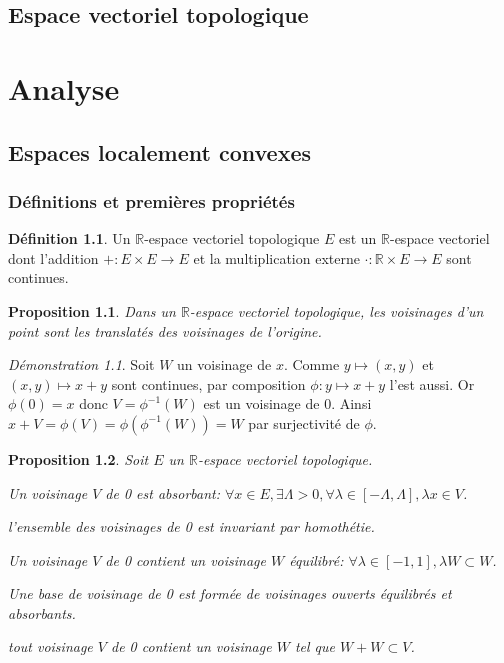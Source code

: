 \documentclass[a4paper, 11pt, french]{book}
\newenvironment{itemise}{\itemize}{\enditemize}
\theoremstyle{plain} %
\newtheorem{proposition}{Proposition}
\theoremstyle{definition} %
\newtheorem{definition}{Définition}
\theoremstyle{remark} %
\newtheorem*{demonstration}{Démonstration}
\newcommand{\1}{\mathds{1}}
\newcommand{\inv}[1]{#1^{-1}}
\newcommand{\R}{\mathbb{R}}
\begin{document}
\chapter{Espace vectoriel topologique}

\part{Analyse}

\chapter{Espaces localement convexes}

\section{Définitions et premières propriétés}

\begin{definition}
	Un $\R$-espace vectoriel topologique $E$ est un $\R$-espace vectoriel dont l'addition $+:E\times E\rightarrow E$ et la multiplication externe $\cdot:\R\times E\rightarrow E$ sont continues.
\end{definition}

\begin{proposition}
	Dans un $\R$-espace vectoriel topologique, les voisinages d’un point sont les translatés des voisinages de l'origine.
\end{proposition}

\begin{demonstration}
	Soit $W$ un voisinage de $x$.
	Comme $y\longmapsto(x, y)$ et $(x, y)\longmapsto x+y$ sont continues, par composition $\phi:y\longmapsto x+y$ l'est aussi.
	Or $\phi(0)=x$ donc $V=\inv{\phi}(W)$ est un voisinage de 0.
	Ainsi $x+V=\phi(V)=\phi(\inv{\phi}(W))=W$ par surjectivité de $\phi$.
\end{demonstration}

\begin{proposition}
	Soit $E$ un $\R$-espace vectoriel topologique.
	\begin{itemise}
		\item Un voisinage $V$ de 0 est absorbant: $\forall x\in E, \exists\Lambda>0, \forall\lambda\in[-\Lambda, \Lambda], \lambda x\in V$.
		\item l'ensemble des voisinages de 0 est invariant par homothétie.
		\item Un voisinage $V$ de 0 contient un voisinage $W$ équilibré: $\forall\lambda\in[-1, 1], \lambda W\subset W$.
		\item Une base de voisinage de 0 est formée de voisinages ouverts équilibrés et absorbants.
		\item tout voisinage $V$ de 0 contient un voisinage $W$ tel que $W+W\subset V$.
	\end{itemise}
\end{proposition}
\end{document}
